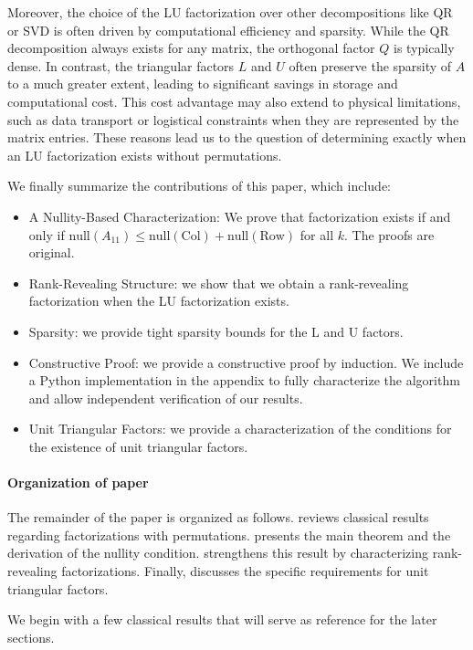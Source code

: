 \documentclass[10pt,twoside]{siamart1116}
\numberwithin{theorem}{section}
\begin{document}
Moreover, the choice of the LU factorization over other decompositions like QR or SVD is often driven by computational efficiency and sparsity. While the QR decomposition always exists for any matrix, the orthogonal factor $Q$ is typically dense. In contrast, the triangular factors $L$ and $U$ often preserve the sparsity of $A$ to a much greater extent, leading to significant savings in storage and computational cost. This cost advantage may also extend to physical limitations, such as data transport or logistical constraints when they are represented by the matrix entries. These reasons lead us to the question of determining exactly when an LU factorization exists without permutations.

We finally summarize the contributions of this paper, which include:
\begin{itemize}
	\item A Nullity-Based Characterization: We prove that factorization exists if and only if $\text{null}(A_{11}) \le \text{null}(\text{Col}) + \text{null}(\text{Row})$ for all $k$. The proofs are original.
	\item Rank-Revealing Structure: we show that we obtain a rank-revealing factorization when the LU factorization exists.
	\item Sparsity: we provide tight sparsity bounds for the L and U factors.
	\item Constructive Proof: we provide a constructive proof by induction. We include a Python implementation in the appendix to fully characterize the algorithm and allow independent verification of our results.
	\item Unit Triangular Factors: we provide a characterization of the conditions for the existence of unit triangular factors.
\end{itemize}

\paragraph{Organization of paper}
The remainder of the paper is organized as follows.  reviews classical results regarding factorizations with permutations.  presents the main theorem and the derivation of the nullity condition.  strengthens this result by characterizing rank-revealing factorizations. Finally,  discusses the specific requirements for unit triangular factors.

We begin with a few classical results that will serve as reference for the later sections.
\end{document}
